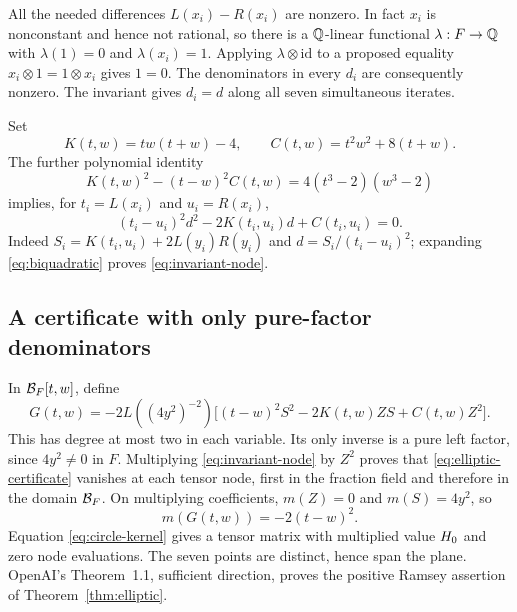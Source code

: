 All the needed differences $L(x_i)-R(x_i)$ are nonzero. In fact
$x_i$ is nonconstant and hence not rational, so there is a
$\mathbb Q$-linear functional $\lambda:F\to\mathbb Q$ with
$\lambda(1)=0$ and $\lambda(x_i)=1$. Applying
$\lambda\otimes\mathrm{id}$ to a proposed equality
$x_i\otimes1=1\otimes x_i$ gives $1=0$.
The denominators in every $d_i$ are consequently nonzero.
The invariant gives $d_i=d$ along all seven simultaneous iterates.

Set
\[
 K(t,w)=tw(t+w)-4,\qquad C(t,w)=t^2w^2+8(t+w).
\]
The further polynomial identity
\begin{equation}\label{eq:biquadratic}
 K(t,w)^2-(t-w)^2C(t,w)=4(t^3-2)(w^3-2)
\end{equation}
implies, for $t_i=L(x_i)$ and $u_i=R(x_i)$,
\begin{equation}\label{eq:invariant-node}
 (t_i-u_i)^2d^2-2K(t_i,u_i)d+C(t_i,u_i)=0.
\end{equation}
Indeed $S_i=K(t_i,u_i)+2L(y_i)R(y_i)$ and
$d=S_i/(t_i-u_i)^2$; expanding \eqref{eq:biquadratic} proves
\eqref{eq:invariant-node}.

\subsection{A certificate with only pure-factor denominators}
In $\mathcal B_F[t,w]$, define
\begin{equation}\label{eq:elliptic-certificate}
 G(t,w)=-2L((4y^2)^{-2})
 \bigl[(t-w)^2S^2-2K(t,w)ZS+C(t,w)Z^2\bigr].
\end{equation}
This has degree at most two in each variable. Its only inverse
is a pure left factor, since $4y^2\ne0$ in $F$.
Multiplying \eqref{eq:invariant-node} by $Z^2$ proves that
\eqref{eq:elliptic-certificate} vanishes at each tensor node,
first in the fraction field and therefore in the domain $\mathcal B_F$.
On multiplying coefficients, $m(Z)=0$ and $m(S)=4y^2$, so
\[
 m(G(t,w))=-2(t-w)^2.
\]
Equation \eqref{eq:circle-kernel} gives a tensor matrix with
multiplied value $H_0$ and zero node evaluations. The seven points
are distinct, hence span the plane. OpenAI's Theorem~1.1,
sufficient direction, proves the positive Ramsey assertion of
Theorem~\ref{thm:elliptic}.

